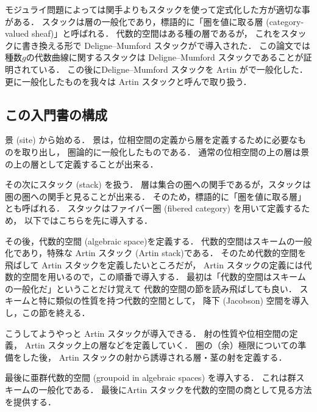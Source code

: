     モジュライ問題によっては関手よりもスタックを使って定式化した方が適切な事がある．
    スタックは層の一般化であり，標語的に「圏を値に取る層 (category-valued sheaf)」と呼ばれる．
    代数的空間はある種の層であるが，
    これをスタックに書き換える形で Deligne--Mumford スタックが\cite{DM69}で導入された．
    この論文では種数$g$の代数曲線に関するスタックは
    Deligne--Mumford スタックであることが証明されている．
    この後にDeligne--Mumford スタックを Artin が\cite{Artin74}で一般化した．
    更に一般化したものを我々は Artin スタックと呼んで取り扱う．

\subsection{この入門書の構成}
    景 (site) から始める．
    景は，位相空間の定義から層を定義するために必要なものを取り出し，
    圏論的に一般化したものである．
    通常の位相空間の上の層は景の上の層として定義することが出来る．

    その次にスタック (stack) を扱う．
    層は集合の圏への関手であるが，スタックは圏の圏への関手と見ることが出来る．
    そのため，標語的に「圏を値に取る層」とも呼ばれる．
    スタックはファイバー圏 (fibered category) を用いて定義するため，
    以下ではこちらを先に導入する．

    その後，代数的空間 (algebraic space)を定義する．
    代数的空間はスキームの一般化であり，特殊な Artin スタック (Artin stack)である．
    そのため代数的空間を飛ばして Artin スタックを定義したいところだが，
    Artin スタックの定義には代数的空間を用いるので，この順番で導入する．
    最初は「代数的空間はスキームの一般化だ」ということだけ覚えて
    代数的空間の節を読み飛ばしても良い．
    スキームと特に類似の性質を持つ代数的空間として，
    降下 (Jacobson) 空間を導入し，この節を終える．

    こうしてようやっと Artin スタックが導入できる．
    射の性質や位相空間の定義， Artin スタック上の層などを定義していく．
    圏の（余）極限についての準備をした後，
    Artin スタックの射から誘導される層・茎の射を定義する．

    最後に亜群代数的空間 (groupoid in algebraic spaces) を導入する．
    これは群スキームの一般化である．
    最後にArtin スタックを代数的空間の商として見る方法を提供する．

